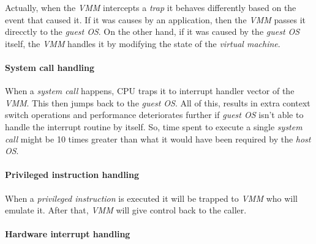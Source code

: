 Actually, when the \emph{VMM} intercepts a \emph{trap} it behaves differently
based on the event that caused it. If it was causes by an application, then the
\emph{VMM} passes it direcctly to the \emph{guest OS}. On the other hand, if it
was caused by the \emph{guest OS} itself, the \emph{VMM} handles it by
modifying the state of the \emph{virtual machine}.

\paragraph{System call handling}
\mbox{}

\bigskip\noindent
\begin{minipage}[t]{0.48\textwidth}
    When a \emph{system call} happens, CPU traps it to interrupt handler vector
    of the \emph{VMM}. This then jumps back to the \emph{guest OS}. All of this,
    results in extra context switch operations and performance deteriorates
    further if \emph{guest OS} isn't able to handle the interrupt
    routine by itself. So, time spent to execute a single \emph{system call} might
    be 10 times greater than what it would have been required by the \emph{host
    OS}.
\end{minipage}
\begin{minipage}[t]{0.48\textwidth}
    \centering
    \strut\vspace*{-\baselineskip}\newline
\end{minipage}

\newpage
\paragraph{Privileged instruction handling}
\mbox{}

\bigskip\noindent
\begin{minipage}[t]{0.48\textwidth}
    When a \emph{privileged instruction} is executed it will be trapped to
    \emph{VMM} who will emulate it. After that, \emph{VMM} will give control back
    to the caller.
\end{minipage}\hfill
\begin{minipage}[t]{0.48\textwidth}
    \centering
    \strut\vspace*{-\baselineskip}\newline
\end{minipage}

\paragraph{Hardware interrupt handling}
\mbox{}

